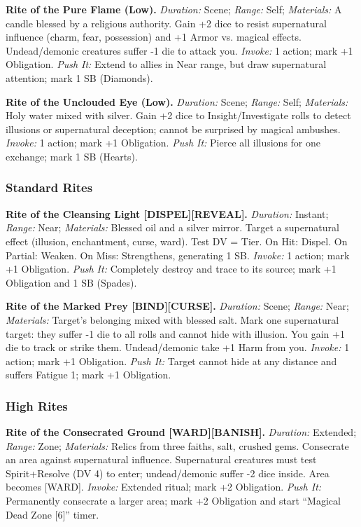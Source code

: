 \documentclass[11pt]{article}
\begin{document}
\textbf{Rite of the Pure Flame (Low).}
\emph{Duration:} Scene; \emph{Range:} Self; \emph{Materials:} A candle blessed by a religious authority.
Gain +2 dice to resist supernatural influence (charm, fear, possession) and +1 Armor vs. magical effects. Undead/demonic creatures suffer -1 die to attack you.
\emph{Invoke:} 1 action; mark +1 Obligation.
\emph{Push It:} Extend to allies in Near range, but draw supernatural attention; mark 1 SB (Diamonds).

\textbf{Rite of the Unclouded Eye (Low).}
\emph{Duration:} Scene; \emph{Range:} Self; \emph{Materials:} Holy water mixed with silver.
Gain +2 dice to Insight/Investigate rolls to detect illusions or supernatural deception; cannot be surprised by magical ambushes.
\emph{Invoke:} 1 action; mark +1 Obligation.
\emph{Push It:} Pierce all illusions for one exchange; mark 1 SB (Hearts).

\subsubsection*{Standard Rites}

\textbf{Rite of the Cleansing Light [DISPEL][REVEAL].}
\emph{Duration:} Instant; \emph{Range:} Near; \emph{Materials:} Blessed oil and a silver mirror.
Target a supernatural effect (illusion, enchantment, curse, ward). Test DV = Tier. On Hit: Dispel. On Partial: Weaken. On Miss: Strengthens, generating 1 SB.
\emph{Invoke:} 1 action; mark +1 Obligation.
\emph{Push It:} Completely destroy and trace to its source; mark +1 Obligation and 1 SB (Spades).

\textbf{Rite of the Marked Prey [BIND][CURSE].}
\emph{Duration:} Scene; \emph{Range:} Near; \emph{Materials:} Target's belonging mixed with blessed salt.
Mark one supernatural target: they suffer -1 die to all rolls and cannot hide with illusion. You gain +1 die to track or strike them. Undead/demonic take +1 Harm from you.
\emph{Invoke:} 1 action; mark +1 Obligation.
\emph{Push It:} Target cannot hide at any distance and suffers Fatigue 1; mark +1 Obligation.

\subsubsection*{High Rites}

\textbf{Rite of the Consecrated Ground [WARD][BANISH].}
\emph{Duration:} Extended; \emph{Range:} Zone; \emph{Materials:} Relics from three faiths, salt, crushed gems.
Consecrate an area against supernatural influence. Supernatural creatures must test Spirit+Resolve (DV 4) to enter; undead/demonic suffer -2 dice inside. Area becomes [WARD].
\emph{Invoke:} Extended ritual; mark +2 Obligation.
\emph{Push It:} Permanently consecrate a larger area; mark +2 Obligation and start ``Magical Dead Zone [6]'' timer.
\end{document}
